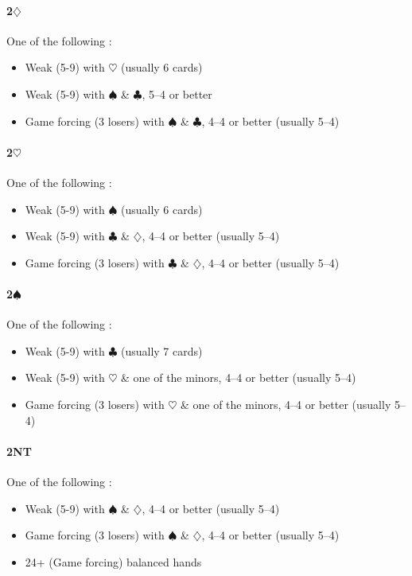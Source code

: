\documentclass[a4paper,14pt]{extarticle}
\begin{document}
\paragraph{2$\diamondsuit$}
One of the following :
\begin{itemize}
\item Weak (5-9) with $\heartsuit$ (usually 6 cards)
\item Weak (5-9) with $\spadesuit$ \& $\clubsuit$, 5--4 or better 
\item Game forcing (3 losers) with $\spadesuit$ \& $\clubsuit$, 4--4 or better  (usually 5--4)
\end{itemize}

\paragraph{2$\heartsuit$}
One of the following :
\begin{itemize}
\item Weak (5-9) with $\spadesuit$ (usually 6 cards)
\item Weak (5-9) with $\clubsuit$ \& $\diamondsuit$, 4--4 or better (usually 5--4)
\item Game forcing (3 losers) with $\clubsuit$ \& $\diamondsuit$, 4--4 or better (usually 5--4)
\end{itemize}

\paragraph{2$\spadesuit$}
One of the following :
\begin{itemize}
\item Weak (5-9) with $\clubsuit$ (usually 7 cards)
\item Weak (5-9) with $\heartsuit$ \& one of the minors, 4--4 or better (usually 5--4)
\item Game forcing (3 losers) with $\heartsuit$ \& one of the minors, 4--4 or better (usually 5--4)
\end{itemize}

\paragraph{2NT}
One of the following :
\begin{itemize}
\item Weak (5-9) with $\spadesuit$ \& $\diamondsuit$, 4--4 or better (usually 5--4)
\item Game forcing (3 losers) with $\spadesuit$ \& $\diamondsuit$, 4--4 or better (usually 5--4)
\item 24+ (Game forcing) balanced hands
\end{itemize}
\end{document}
